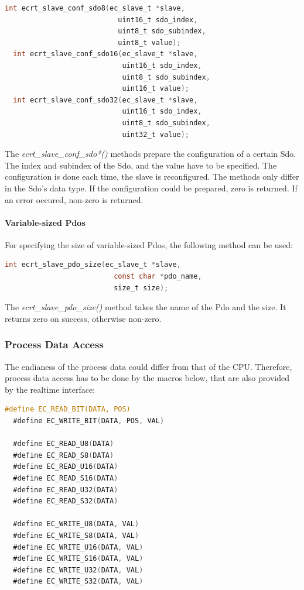 \documentclass[a4paper,12pt,BCOR6mm,bibtotoc,idxtotoc]{scrbook}
\begin{document}
\begin{lstlisting}[language=C]
  int ecrt_slave_conf_sdo8(ec_slave_t *slave,
                           uint16_t sdo_index,
                           uint8_t sdo_subindex,
                           uint8_t value);
  int ecrt_slave_conf_sdo16(ec_slave_t *slave,
                            uint16_t sdo_index,
                            uint8_t sdo_subindex,
                            uint16_t value);
  int ecrt_slave_conf_sdo32(ec_slave_t *slave,
                            uint16_t sdo_index,
                            uint8_t sdo_subindex,
                            uint32_t value);
\end{lstlisting}

The \textit{ecrt\_slave\_conf\_sdo*()} methods prepare the
configuration of a certain Sdo. The index and subindex of the Sdo, and
the value have to be specified. The configuration is done each time,
the slave is reconfigured. The methods only differ in the Sdo's data
type. If the configuration could be prepared, zero is returned. If an
error occured, non-zero is returned.

\paragraph{Variable-sized Pdos}

For specifying the size of variable-sized Pdos, the following method
can be used:

\begin{lstlisting}[language=C]
  int ecrt_slave_pdo_size(ec_slave_t *slave,
                          const char *pdo_name,
                          size_t size);
\end{lstlisting}

The \textit{ecrt\_slave\_pdo\_size()} method takes the name of the Pdo
and the size. It returns zero on success, otherwise non-zero.

\subsubsection{Process Data Access}
\label{sec:macros}

The endianess of the process data could differ from that of the CPU.
Therefore, process data access has to be done by the macros below,
that are also provided by the realtime interface:

\begin{lstlisting}[language=C]
  #define EC_READ_BIT(DATA, POS)
  #define EC_WRITE_BIT(DATA, POS, VAL)

  #define EC_READ_U8(DATA)
  #define EC_READ_S8(DATA)
  #define EC_READ_U16(DATA)
  #define EC_READ_S16(DATA)
  #define EC_READ_U32(DATA)
  #define EC_READ_S32(DATA)

  #define EC_WRITE_U8(DATA, VAL)
  #define EC_WRITE_S8(DATA, VAL)
  #define EC_WRITE_U16(DATA, VAL)
  #define EC_WRITE_S16(DATA, VAL)
  #define EC_WRITE_U32(DATA, VAL)
  #define EC_WRITE_S32(DATA, VAL)
\end{lstlisting}
\end{document}
